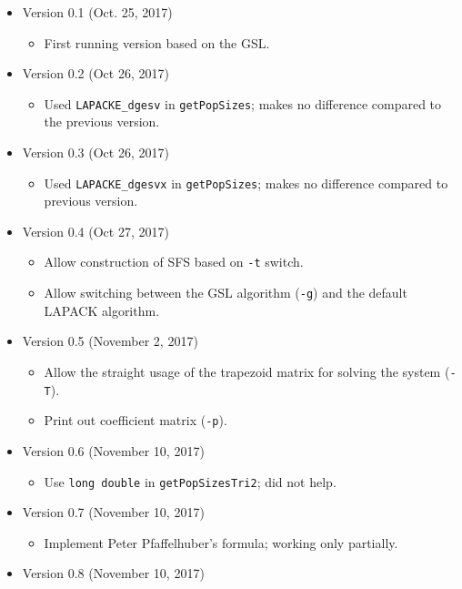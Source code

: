 \documentclass[a4paper]{article}
\newcommand{\ty}{\texttt}
\begin{document}
\begin{itemize}
\item Version 0.1 (Oct. 25, 2017)
  \begin{itemize}
  \item First running version based on the GSL.
  \end{itemize}
\item Version 0.2 (Oct 26, 2017)
  \begin{itemize}
    \item Used \ty{LAPACKE\_dgesv} in \ty{getPopSizes}; makes no
      difference compared to the previous version.
  \end{itemize}
\item Version 0.3 (Oct 26, 2017)
  \begin{itemize}
    \item Used \ty{LAPACKE\_dgesvx} in \ty{getPopSizes}; makes no
      difference compared to previous version.
  \end{itemize}
\item Version 0.4 (Oct 27, 2017)
  \begin{itemize}
  \item Allow construction of SFS based on \ty{-t} switch.
  \item Allow switching between the GSL algorithm (\ty{-g}) and the
    default LAPACK algorithm. 
  \end{itemize}
\item Version 0.5 (November 2, 2017)
  \begin{itemize}
    \item Allow the straight usage of the trapezoid matrix for solving
      the system (\ty{-T}).
    \item Print out coefficient matrix (\ty{-p}).
  \end{itemize}
\item Version 0.6 (November 10, 2017)
  \begin{itemize}
  \item Use \ty{long double} in \ty{getPopSizesTri2}; did not help.
  \end{itemize}
\item Version 0.7 (November 10, 2017)
  \begin{itemize}
    \item Implement Peter Pfaffelhuber's formula; working only partially.
  \end{itemize}
\item Version 0.8 (November 10, 2017)
  \begin{itemize}

\end{itemize}
\end{itemize}
\end{document}
